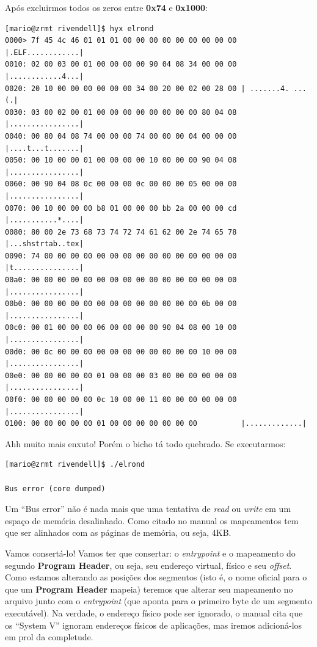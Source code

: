\documentclass[12pt]{article}
\begin{document}
Após excluirmos todos os zeros entre \textbf{0x74} e \textbf{0x1000}:


\begin{verbatim}
[mario@zrmt rivendell]$ hyx elrond
0000> 7f 45 4c 46 01 01 01 00 00 00 00 00 00 00 00 00 |.ELF............|
0010: 02 00 03 00 01 00 00 00 00 90 04 08 34 00 00 00 |............4...|
0020: 20 10 00 00 00 00 00 00 34 00 20 00 02 00 28 00 | .......4. ...(.|
0030: 03 00 02 00 01 00 00 00 00 00 00 00 00 80 04 08 |................|
0040: 00 80 04 08 74 00 00 00 74 00 00 00 04 00 00 00 |....t...t.......|
0050: 00 10 00 00 01 00 00 00 00 10 00 00 00 90 04 08 |................|
0060: 00 90 04 08 0c 00 00 00 0c 00 00 00 05 00 00 00 |................|
0070: 00 10 00 00 00 b8 01 00 00 00 bb 2a 00 00 00 cd |...........*....|
0080: 80 00 2e 73 68 73 74 72 74 61 62 00 2e 74 65 78 |...shstrtab..tex|
0090: 74 00 00 00 00 00 00 00 00 00 00 00 00 00 00 00 |t...............|
00a0: 00 00 00 00 00 00 00 00 00 00 00 00 00 00 00 00 |................|
00b0: 00 00 00 00 00 00 00 00 00 00 00 00 00 0b 00 00 |................|
00c0: 00 01 00 00 00 06 00 00 00 00 90 04 08 00 10 00 |................|
00d0: 00 0c 00 00 00 00 00 00 00 00 00 00 00 10 00 00 |................|
00e0: 00 00 00 00 00 01 00 00 00 03 00 00 00 00 00 00 |................|
00f0: 00 00 00 00 00 0c 10 00 00 11 00 00 00 00 00 00 |................|
0100: 00 00 00 00 00 01 00 00 00 00 00 00 00          |.............|
\end{verbatim}
Ahh muito mais enxuto! Porém o bicho tá todo quebrado. Se executarmos:

\begin{verbatim}
[mario@zrmt rivendell]$ ./elrond

Bus error (core dumped)
\end{verbatim}
 Um ``Bus error'' não é nada mais que uma tentativa de \emph{read} ou \emph{write} em um espaço de memória desalinhado. Como citado no manual os mapeamentos tem que ser alinhados com as páginas de memória, ou seja, 4KB.

Vamos consertá-lo! Vamos ter que consertar: o \emph{entrypoint} e o mapeamento do segundo \textbf{Program Header}, ou seja, seu endereço virtual, físico e seu \emph{offset}. Como estamos alterando as posições dos segmentos (isto é, o nome oficial para o que um \textbf{Program Header} mapeia)  teremos que alterar seu mapeamento no arquivo junto com o \emph{entrypoint} (que aponta para o primeiro byte de um segmento executável). Na verdade, o endereço físico pode ser ignorado, o manual cita que os “System V” ignoram endereços físicos de aplicações, mas iremos adicioná-los em prol da completude.
\end{document}

